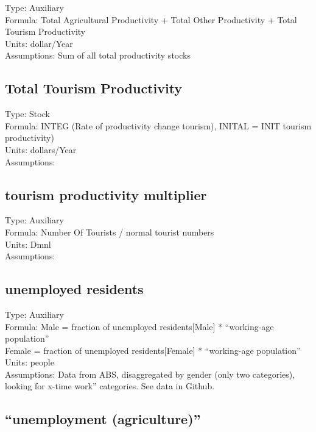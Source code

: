 \documentclass[
  11pt,
]{book}
\begin{document}
Type: Auxiliary\\
Formula: Total Agricultural Productivity + Total Other Productivity + Total Tourism Productivity\\
Units: dollar/Year\\
Assumptions: Sum of all total productivity stocks

\hypertarget{total-tourism-productivity}{%
\subsection{Total Tourism Productivity}\label{total-tourism-productivity}}

Type: Stock\\
Formula: INTEG (Rate of productivity change tourism), INITAL = INIT tourism productivity)\\
Units: dollars/Year\\
Assumptions:

\hypertarget{tourism-productivity-multiplier}{%
\subsection{tourism productivity multiplier}\label{tourism-productivity-multiplier}}

Type: Auxiliary\\
Formula: Number Of Tourists / normal tourist numbers\\
Units: Dmnl\\
Assumptions:

\hypertarget{unemployed-residents}{%
\subsection{unemployed residents}\label{unemployed-residents}}

Type: Auxiliary\\
Formula: Male = fraction of unemployed residents{[}Male{]} * ``working-age population''\\
Female = fraction of unemployed residents{[}Female{]} * ``working-age population''\\
Units: people\\
Assumptions: Data from ABS, disaggregated by gender (only two categories), looking for x-time work'' categories. See data in Github.

\hypertarget{unemployment-agriculture}{%
\subsection{``unemployment (agriculture)''}\label{unemployment-agriculture}}
\end{document}
